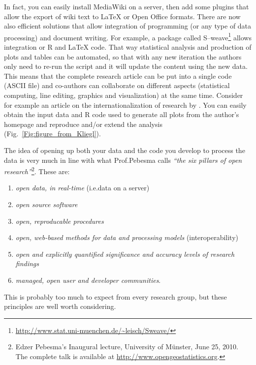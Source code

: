 \documentclass[graybox,envcountchap,sectrefs,UStrade]{svmono}
\begin{document}
In fact, you can easily install \textsf{MediaWiki} on a server, then add some plugins that allow the export of wiki text to {\LaTeX} or Open Office formats. There are now also efficient solutions that allow integration of programming (or any type of data processing) and document writing. For example, a package called \textsf{S--weave}\footnote{\url{http://www.stat.uni-muenchen.de/~leisch/Sweave/}} allows integration or \textsf{R} and {\LaTeX} code. That way statistical analysis and production of plots and tables can be automated, so that with any new iteration the authors only need to re-run the script and it will update the content using the new data. This means that the complete research article can be put into a single code (ASCII file) and co-authors can collaborate on different aspects (statistical computing, line editing, graphics and visualization) at the same time. Consider for example an article on the internationalization of research by \citet{Kliegl2011Scientometrics}. You can easily obtain the input data and \textsf{R} code used to generate all plots from the author's homepage and reproduce and/or extend the analysis (Fig.\@~\ref{Fig:figure_from_Kliegl}). \par

The idea of opening up both your data and the code you develop to process the data is very much in line with what Prof.\@ Pebesma calls \emph{``the six pillars of open research''}\footnote{Edzer Pebesma's Inaugural lecture, University of M\"{u}nster, June 25, 2010. The complete talk is available at \url{http://www.opengeostatistics.org}.}. These are:

\begin{enumerate}
  \item \emph{open data, in real-time} (i.e.\@ data on a server)
  \item \emph{open source software}
  \item \emph{open, reproducable procedures}
  \item \emph{open, web-based methods for data and processing models} (interoperability)
  \item \emph{open and explicitly quantified significance and accuracy levels of research findings}
  \item \emph{managed, open user and developer communities}.
\end{enumerate}

This is probably too much to expect from every research group, but these principles are well worth considering.\par
\end{document}
